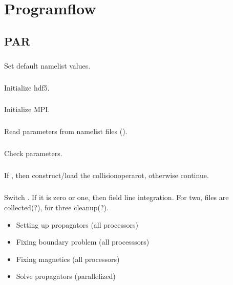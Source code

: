 \chapter{Programflow}

\section{PAR}

\paragraph{}
Set default namelist values.

\paragraph{}
Initialize hdf5.

\paragraph{}
Initialize MPI.

\paragraph{}
Read parameters from namelist files ().

\paragraph{}
Check parameters.

\paragraph{}
If , then construct/load the
collisionoperarot, otherwise continue.

\paragraph{}
Switch .
If it is zero or one, then field line integration. For two, files are
collected(?), for three cleanup(?).
\begin{itemize}
  \item Setting up propagators (all processors)
  \item Fixing boundary problem (all processsors)
  \item Fixing magnetics (all processors)
  \item Solve propagators (parallelized)
\end{itemize}

